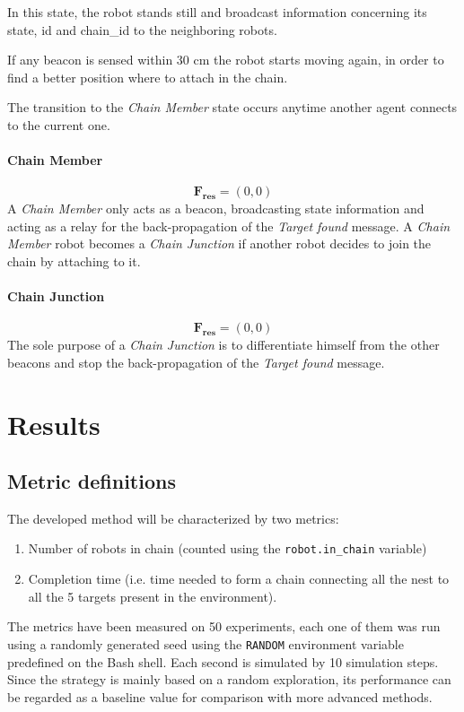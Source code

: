 In this state, the robot stands still and broadcast information concerning its state, id and chain\_id to the neighboring robots.

If any beacon is sensed within 30 cm the robot starts moving again, in order to 
find a better position where to attach in the chain.

The transition to the \emph{Chain Member} state occurs anytime another agent connects to the current one.

\paragraph{Chain Member}
\begin{equation}
  \mathbf{F_{res}} = (0,0)
\end{equation}
A \emph{Chain Member} only acts as a beacon, broadcasting state information and acting as a relay for the back-propagation of the \emph{Target found} message.
A \emph{Chain Member} robot becomes a \emph{Chain Junction} if another robot decides to 
join the chain by attaching to it.

\paragraph{Chain Junction}
\begin{equation}
  \mathbf{F_{res}} = (0,0)
\end{equation}
The sole purpose of a \emph{Chain Junction} is to differentiate himself from the other beacons and stop the back-propagation of the \emph{Target found} message.

\section{Results} \label{sec:results}
\subsection{Metric definitions}\label{subsec:metric}
The developed method will be characterized by two metrics:
\begin{enumerate}
  \item Number of robots in chain (counted using the \verb|robot.in_chain| variable)
  \item Completion time (i.e. time needed to form a chain connecting  all the nest to all the 5 targets present in the environment).
\end{enumerate}
The metrics have been measured on 50 experiments, each one of them was run using a randomly generated seed using the \verb|RANDOM| environment variable predefined on the Bash shell.
Each second is simulated by 10 simulation steps.
Since the strategy is mainly based on a random exploration, its performance can be regarded as a baseline value for comparison with more advanced methods.

